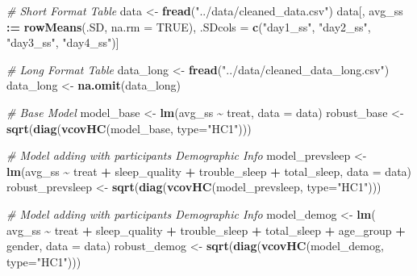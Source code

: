 \documentclass[
]{article}
\newenvironment{Shaded}{\begin{snugshade}}{\end{snugshade}}
\newcommand{\AttributeTok}[1]{\textcolor[rgb]{0.13,0.29,0.53}{#1}}
\newcommand{\CommentTok}[1]{\textcolor[rgb]{0.56,0.35,0.01}{\textit{#1}}}
\newcommand{\ConstantTok}[1]{\textcolor[rgb]{0.56,0.35,0.01}{#1}}
\newcommand{\FunctionTok}[1]{\textcolor[rgb]{0.13,0.29,0.53}{\textbf{#1}}}
\newcommand{\NormalTok}[1]{#1}
\newcommand{\OtherTok}[1]{\textcolor[rgb]{0.56,0.35,0.01}{#1}}
\newcommand{\SpecialCharTok}[1]{\textcolor[rgb]{0.81,0.36,0.00}{\textbf{#1}}}
\newcommand{\StringTok}[1]{\textcolor[rgb]{0.31,0.60,0.02}{#1}}
\begin{document}
\begin{Shaded}
\begin{Highlighting}[]
\CommentTok{\# Short Format Table}
\NormalTok{data }\OtherTok{\textless{}{-}} \FunctionTok{fread}\NormalTok{(}\StringTok{"../data/cleaned\_data.csv"}\NormalTok{)}
\NormalTok{data[, avg\_ss }\SpecialCharTok{:=} \FunctionTok{rowMeans}\NormalTok{(.SD, }\AttributeTok{na.rm =} \ConstantTok{TRUE}\NormalTok{), .SDcols }\OtherTok{=} \FunctionTok{c}\NormalTok{(}\StringTok{"day1\_ss"}\NormalTok{, }\StringTok{"day2\_ss"}\NormalTok{, }\StringTok{"day3\_ss"}\NormalTok{, }\StringTok{"day4\_ss"}\NormalTok{)]}

\CommentTok{\# Long Format Table}
\NormalTok{data\_long }\OtherTok{\textless{}{-}} \FunctionTok{fread}\NormalTok{(}\StringTok{"../data/cleaned\_data\_long.csv"}\NormalTok{)}
\NormalTok{data\_long }\OtherTok{\textless{}{-}} \FunctionTok{na.omit}\NormalTok{(data\_long)}

\CommentTok{\# Base Model}
\NormalTok{model\_base }\OtherTok{\textless{}{-}} \FunctionTok{lm}\NormalTok{(avg\_ss }\SpecialCharTok{\textasciitilde{}}\NormalTok{ treat, }\AttributeTok{data =}\NormalTok{ data)}
\NormalTok{robust\_base }\OtherTok{\textless{}{-}} \FunctionTok{sqrt}\NormalTok{(}\FunctionTok{diag}\NormalTok{(}\FunctionTok{vcovHC}\NormalTok{(model\_base, }\AttributeTok{type=}\StringTok{"HC1"}\NormalTok{)))}

\CommentTok{\# Model adding with participants\textquotesingle{} Demographic Info}
\NormalTok{model\_prevsleep }\OtherTok{\textless{}{-}} \FunctionTok{lm}\NormalTok{(avg\_ss }\SpecialCharTok{\textasciitilde{}}\NormalTok{ treat }\SpecialCharTok{+}\NormalTok{ sleep\_quality }\SpecialCharTok{+} 
\NormalTok{                        trouble\_sleep }\SpecialCharTok{+}\NormalTok{ total\_sleep, }
                      \AttributeTok{data =}\NormalTok{ data)}
\NormalTok{robust\_prevsleep }\OtherTok{\textless{}{-}} \FunctionTok{sqrt}\NormalTok{(}\FunctionTok{diag}\NormalTok{(}\FunctionTok{vcovHC}\NormalTok{(model\_prevsleep, }\AttributeTok{type=}\StringTok{"HC1"}\NormalTok{)))}

\CommentTok{\# Model adding with participants\textquotesingle{} Demographic Info}
\NormalTok{model\_demog }\OtherTok{\textless{}{-}} \FunctionTok{lm}\NormalTok{(}
\NormalTok{  avg\_ss }\SpecialCharTok{\textasciitilde{}}\NormalTok{ treat }\SpecialCharTok{+}\NormalTok{ sleep\_quality }\SpecialCharTok{+}\NormalTok{ trouble\_sleep }\SpecialCharTok{+} 
\NormalTok{    total\_sleep }\SpecialCharTok{+}\NormalTok{ age\_group }\SpecialCharTok{+}\NormalTok{ gender, }
  \AttributeTok{data =}\NormalTok{ data)}
\NormalTok{robust\_demog }\OtherTok{\textless{}{-}} \FunctionTok{sqrt}\NormalTok{(}\FunctionTok{diag}\NormalTok{(}\FunctionTok{vcovHC}\NormalTok{(model\_demog, }\AttributeTok{type=}\StringTok{"HC1"}\NormalTok{)))}


\end{Highlighting}
\end{Shaded}
\end{document}
